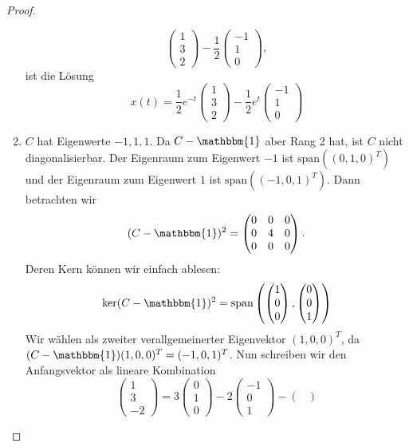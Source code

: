 \begin{proof}
\begin{parts}
\begin{enumerate}[label=\roman*)]
\[\begin{pmatrix}
1 \\ 3 \\ 2
\end{pmatrix}-\frac 12 \begin{pmatrix}
-1 \\ 1 \\ 0
\end{pmatrix},\]
ist die L\"{o}sung
\[x(t) = \frac 12e^{-t}\begin{pmatrix}
	1 \\ 3 \\ 2
\end{pmatrix}-\frac 12 e^t \begin{pmatrix}
-1 \\ 1 \\ 0
\end{pmatrix}\]
\item $C$ hat Eigenwerte $-1,1,1$. Da $C-\mathbbm{1}$ aber Rang 2 hat, ist $C$ nicht diagonalisierbar. Der Eigenraum zum Eigenwert $-1$ ist $\text{span}((0,1,0)^T)$ und der Eigenraum zum Eigenwert $1$ ist $\text{span}((-1,0,1)^T)$. Dann betrachten wir
\[(C-\mathbbm{1})^2 = \begin{pmatrix}
	0 & 0 & 0 \\ 0 & 4 & 0 \\ 0 & 0 & 0
\end{pmatrix}.\]
Deren Kern können wir einfach ablesen:
\[\ker(C-\mathbbm{1})^2 = \text{span}\left(\begin{pmatrix}
	1 \\ 0 \\ 0
\end{pmatrix}, \begin{pmatrix}
0 \\ 0 \\ 1
\end{pmatrix}\right)\]
Wir wählen als zweiter verallgemeinerter Eigenvektor $(1,0,0)^T$, da $(C-\mathbbm{1})(1,0,0)^T = (-1,0,1)^T$. Nun schreiben wir den Anfangsvektor als lineare Kombination
\[\begin{pmatrix}
	1 \\ 3 \\ -2
\end{pmatrix}=3\begin{pmatrix}
0 \\ 1 \\ 0
\end{pmatrix}-2\begin{pmatrix}
-1 \\ 0 \\ 1
\end{pmatrix}-\begin{pmatrix}

\end{pmatrix}\]
\end{enumerate}
\end{parts}
\end{proof}
